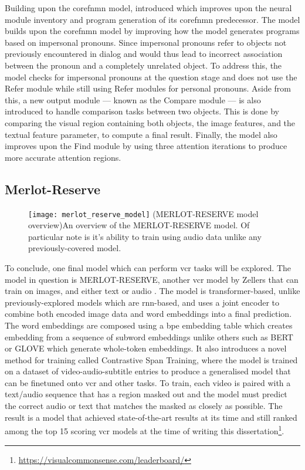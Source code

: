 Building upon the \gls{corefnmn} model, \citeauthor{cho_visual_2021} introduced \cite{cho_visual_2021} which improves upon the neural module inventory and program generation of its \gls{corefnmn} predecessor.
The model builds upon the \gls{corefnmn} model by improving how the model generates programs based on impersonal pronouns.
Since impersonal pronouns refer to objects not previously encountered in dialog and would thus lead to incorrect association between the pronoun and a completely unrelated object.
To address this, the model checks for impersonal pronouns at the question stage and does not use the Refer module while still using Refer modules for personal pronouns.
Aside from this, a new output module --- known as the Compare module --- is also introduced to handle comparison tasks between two objects.
This is done by comparing the visual region containing both objects, the image features, and the textual feature parameter, to compute a final result.
Finally, the model also improves upon the Find module by using three attention iterations to produce more accurate attention regions.

\subsection{Merlot-Reserve}
\label{subsec:merlot_reserve}

\begin{figure}[htbp]
    \centering
    \texttt{[image: merlot\_reserve\_model]}
    \captionsource(MERLOT-RESERVE model overview){An overview of the MERLOT-RESERVE model. Of particular note is it's ability to train using audio data unlike any previously-covered model. \label{fig:merlot_reserve_model_overview}}{\citeauthor{zellers_merlot_2022}\cite{zellers_merlot_2022}}
\end{figure}

To conclude, one final model which can perform \gls{vcr} tasks will be explored.
The model in question is MERLOT-RESERVE, another \gls{vcr} model by Zellers that can train on images, and either text or audio \cite{zellers_merlot_2022}.
The model is transformer-based, unlike previously-explored models which are \gls{rnn}-based, and uses a joint encoder to combine both encoded image data and word embeddings into a final prediction.
The word embeddings are composed using a \gls{bpe} embedding table which creates embedding from a sequence of subword embeddings unlike others such as BERT or GLOVE which generate whole-token embeddings.
It also introduces a novel method for training called Contrastive Span Training, where the model is trained on a dataset of video-audio-subtitle entries to produce a generalised model that can be finetuned onto \gls{vcr} and other tasks\cite{zellers_merlot_2022}.
To train, each video is paired with a text/audio sequence that has a region masked out and the model must predict the correct audio or text that matches the masked as closely as possible.
The result is a model that achieved state-of-the-art results at its time\cite{zellers_merlot_2022} and still ranked among the top 15 scoring \gls{vcr} models at the time of writing this dissertation\footnote[1]{\url{https://visualcommonsense.com/leaderboard/}}.
